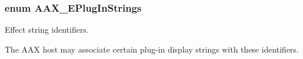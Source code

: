 \hypertarget{a00206_a86f7310877399d9d4d2ea4863d472476}{}
\subsubsection[{A\+A\+X\+\_\+\+E\+Plug\+In\+Strings}]{\setlength{\rightskip}{0pt plus 5cm}enum {\bf A\+A\+X\+\_\+\+E\+Plug\+In\+Strings}}\label{a00206_a86f7310877399d9d4d2ea4863d472476}


Effect string identifiers. 

The A\+A\+X host may associate certain plug-\/in display strings with these identifiers.

